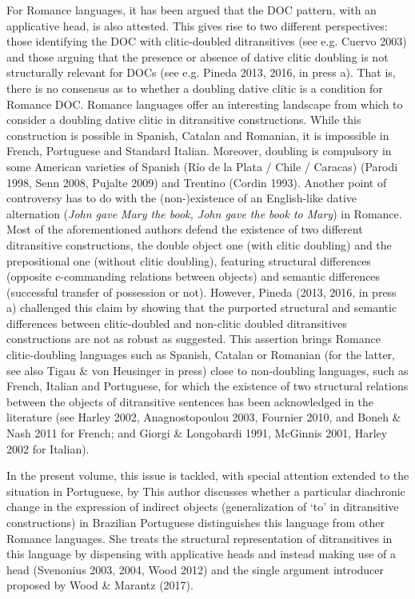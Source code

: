\begin{styleListNumberi}
For Romance languages, it has been argued that the DOC pattern, with an applicative head, is also attested. This gives rise to two different perspectives: those identifying the DOC with clitic-doubled ditransitives (see e.g. Cuervo 2003) and those arguing that the presence or absence of dative clitic doubling is not structurally relevant for DOCs (see e.g. Pineda 2013, 2016, in press a). That is, there is no consensus as to whether a doubling dative clitic is a  condition for Romance DOC. Romance languages offer an interesting landscape from which to consider a doubling dative clitic in ditransitive constructions. While this construction is possible in Spanish, Catalan and Romanian, it is impossible in French, Portuguese and Standard Italian. Moreover, doubling is compulsory in some American varieties of Spanish (Río de la Plata / Chile / Caracas) (Parodi 1998, Senn 2008, Pujalte 2009) and Trentino (Cordin 1993). Another point of controversy has to do with the (non-)existence of an English-like dative alternation (\textit{John gave Mary the book, John gave the book to Mary}) in Romance. Most of the aforementioned authors defend the existence of two different ditransitive constructions, the double object one (with clitic doubling) and the prepositional one (without clitic doubling), featuring structural differences (opposite c-commanding relations between objects) and semantic differences (successful transfer of possession or not). However, Pineda (2013, 2016, in press a) challenged this claim by showing that the purported structural and semantic differences between clitic-doubled and non-clitic doubled ditransitives constructions are not as robust as suggested. This assertion brings Romance clitic-doubling languages such as Spanish, Catalan or Romanian (for the latter, see also Tigau \& von Heusinger in press) close to non-doubling languages, such as French, Italian and Portuguese, for which the existence of two structural relations between the objects of ditransitive sentences has been acknowledged in the literature (see Harley 2002, Anagnostopoulou 2003, Fournier 2010, and Boneh \& Nash 2011 for French; and Giorgi \& Longobardi 1991, McGinnis 2001, Harley 2002 for Italian). 
\end{styleListNumberi}

\begin{styleListNumberi}
In the present volume, this issue is tackled, with special attention extended to the situation in Portuguese, by This author discusses whether a particular diachronic change in the expression of indirect objects (generalization of ‘to’ in ditransitive constructions) in Brazilian Portuguese distinguishes this language from other Romance languages. She treats the structural representation of ditransitives in this language by dispensing with applicative heads and instead making use of a  head (Svenonius 2003, 2004, Wood 2012) and the  single argument introducer proposed by Wood \& Marantz (2017). 
\end{styleListNumberi}

